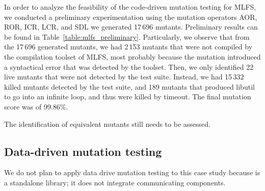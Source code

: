 

In order to analyze the feasibility of the code-driven mutation testing for MLFS, we conducted a preliminary experimentation using the mutation operators AOR, ROR, ICR, LCR, and SDL we generated 17\,696 mutants. Preliminary results can be found in Table~\ref{table:mlfs_preliminary}.
Particularly, we observe that from the 17\,696 generated mutants, we had 2\,153 mutants that were not compiled by the compilation toolset of MLFS, most probably because the mutation introduced a syntactical error that was detected by the toolset.
Then, we only identified 22 live mutants that were not detected by the test suite. Instead, we had 15\,332 killed mutants detected by the test suite, and 189 mutants that produced libutil to go into an infinite loop, and thus were killed by timeout. The final mutation score was of 99.86\%.

The identification of equivalent mutants still needs to be assessed.


\subsection{Data-driven mutation testing}

We do not plan to apply data drive mutation testing to this case study because is a standalone library; it does not integrate communicating components.



